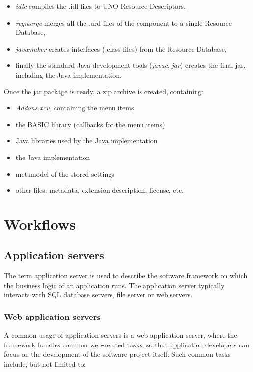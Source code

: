 \begin{itemize}
\item \emph{idlc} compiles the .idl files to UNO Resource Descriptors,
\item \emph{regmerge} merges all the .urd files of the component to a single Resource Database,
\item \emph{javamaker} creates interfaces (.class files) from the Resource Database,
\item finally the standard Java development tools (\emph{javac}, \emph{jar})
creates the final jar, including the Java implementation.
\end{itemize}

Once the jar package is ready, a zip archive is created, containing:

\begin{itemize}
\item \emph{Addons.xcu}, containing the menu items
\item the BASIC library (callbacks for the menu items)
\item Java libraries used by the Java implementation
\item the Java implementation
\item metamodel of the stored settings
\item other files: metadata, extension description, license, etc.
\end{itemize}

\section{Workflows}

\subsection{Application servers}

The term application server is used to describe the software framework on which
the business logic of an application runs. The application server typically
interacts with SQL database servers, file server or web servers.

\subsubsection*{Web application servers}

A common usage of application servers is a web application server, where the
framework handles common web-related tasks, so that application developers can
focus on the development of the software project itself. Such common tasks
include, but not limited to:

